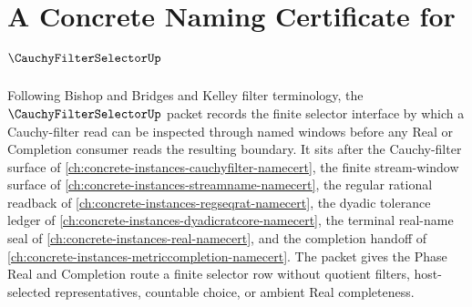 \chapter{A Concrete Naming Certificate for $\CauchyFilterSelectorUp$}
\label{ch:concrete-instances-cauchy-filter-selector-namecert}

Following Bishop and Bridges and Kelley filter terminology, the $\CauchyFilterSelectorUp$ packet records the finite selector interface by which a Cauchy-filter read can be inspected through named windows before any Real or Completion consumer reads the resulting boundary. It sits after the Cauchy-filter surface of \autoref{ch:concrete-instances-cauchyfilter-namecert}, the finite stream-window surface of \autoref{ch:concrete-instances-streamname-namecert}, the regular rational readback of \autoref{ch:concrete-instances-regseqrat-namecert}, the dyadic tolerance ledger of \autoref{ch:concrete-instances-dyadicratcore-namecert}, the terminal real-name seal of \autoref{ch:concrete-instances-real-namecert}, and the completion handoff of \autoref{ch:concrete-instances-metriccompletion-namecert}. The packet gives the Phase Real and Completion route a finite selector row without quotient filters, host-selected representatives, countable choice, or ambient Real completeness.

